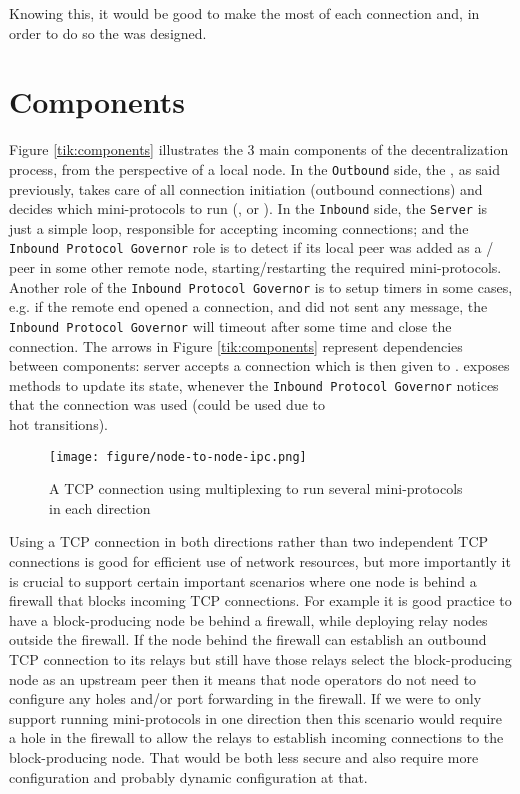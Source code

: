 Knowing this, it would be good to make the most of each connection and, in order to do so the
\Connmngr{} was designed.

\section{Components}

Figure \ref{tik:components} illustrates the 3 main components of the decentralization
process, from the perspective of a local node. In the \texttt{Outbound} side, the
\ptopgov{}, as said previously, takes care of all connection initiation (outbound
connections) and decides which mini-protocols to run (\established{}, \warm{} or \hot{}).
In the \texttt{Inbound} side, the \texttt{Server} is just a simple loop, responsible for accepting incoming
connections; and the \texttt{Inbound Protocol Governor} role is to detect if its local peer was
added as a \warm{}/\hot{} peer in some other remote node, starting/restarting the required
mini-protocols. Another role of the \texttt{Inbound Protocol Governor} is to setup timers in
some cases, e.g. if the remote end opened a connection, and did not sent any message, the
\texttt{Inbound Protocol Governor} will timeout after some time and close the connection.
The arrows in Figure \ref{tik:components} represent dependencies between components:
server accepts a connection which is then given to \Connmngr{}. \Connmngr{} exposes methods to update its state,
whenever the \texttt{Inbound Protocol Governor} notices that the connection was used
(could be used due to \warm{}\\hot{} transitions).

\begin{figure}[h]
    \centering
    \texttt{[image: figure/node-to-node-ipc.png]}
    \caption{A TCP connection using multiplexing to run several mini-protocols
             in each direction}
    \label{fig:protocol-diagram}
\end{figure}

Using a TCP connection in both directions rather than two independent TCP
connections is good for efficient use of network resources, but more importantly
it is crucial to support certain important scenarios where one node is behind a
firewall that blocks incoming TCP connections. For example it is good practice
to have a block-producing node be behind a firewall, while deploying relay nodes
outside the firewall. If the node behind the firewall can establish an outbound
TCP connection to its relays but still have those relays select the
block-producing node as an upstream peer then it means that node operators do
not need to configure any holes and/or port forwarding in the firewall. If we
were to only support running mini-protocols in one direction then this scenario
would require a hole in the firewall to allow the relays to establish incoming
connections to the block-producing node. That would be both less secure and also
require more configuration and probably dynamic configuration at that.

